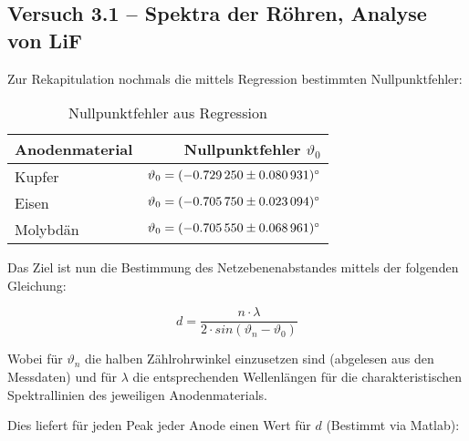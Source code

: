 \subsection{Versuch 3.1 -- Spektra der R\"ohren, Analyse von LiF}
\label{subsec:error:spektra}

Zur Rekapitulation nochmals die mittels Regression bestimmten Nullpunktfehler:

\begin{table}[h!]
	\centering
	\small
    \caption{Nullpunktfehler aus Regression}
	\label{tab:nullpunktfehler:LiF}
	\begin{tabular}{lr}
		\toprule

        Anodenmaterial & Nullpunktfehler $\vartheta_0$ \\

        \midrule

        Kupfer &
        $\vartheta_0 = \SI{-0.72925 \pm 0.080931}{\degree}$ \\

        Eisen &
        $\vartheta_0 = \SI{-0.70575 \pm 0.023094}{\degree}$ \\

        Molybd\"an &
        $\vartheta_0 = \SI{-0.70555 \pm 0.068961}{\degree}$ \\

		\bottomrule
	\end{tabular}
\end{table}

Das Ziel ist nun die Bestimmung des Netzebenenabstandes mittels der folgenden Gleichung:

\begin{equation}
	\label{eq:braggLattice}
    d = \frac{n \cdot \lambda}{2 \cdot sin \left( \vartheta_n - \vartheta_0 \right)}
\end{equation}

Wobei  f\"ur  $\vartheta_n$  die   halben  Z\"ahlrohrwinkel  einzusetzen  sind
(abgelesen  aus   den  Messdaten)  und  f\"ur   $\lambda$  die  entsprechenden
Wellenl\"angen  f\"ur  die  charakteristischen Spektrallinien  des  jeweiligen
Anodenmaterials.

Dies liefert f\"ur  jeden Peak jeder Anode einen Wert  f\"ur $d$ (Bestimmt via
Matlab):

